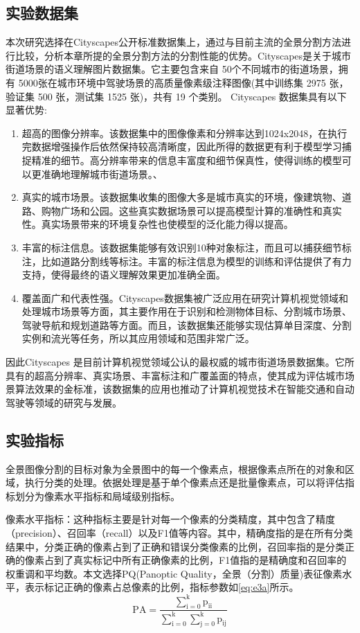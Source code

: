 \subsection{实验数据集}
本次研究选择在Cityscapes公开标准数据集上，通过与目前主流的全景分割方法进行比较，分析本章所提的全景分割方法的分割性能的优势。Cityscapes是关于城市街道场景的语义理解图片数据集。它主要包含来自 50个不同城市的街道场景，拥有 5000张在城市环境中驾驶场景的高质量像素级注释图像(其中训练集 2975 张，验证集 500 张，测试集 1525 张)，共有 19 个类别。
Cityscapes 数据集具有以下显著优势:
\begin{enumerate}
    \item 超高的图像分辨率。该数据集中的图像像素和分辨率达到1024x2048，在执行完数据增强操作后依然保持较高清晰度，因此所得的数据更有利于模型学习捕捉精准的细节。高分辨率带来的信息丰富度和细节保真性，使得训练的模型可以更准确地理解城市街道场景。、
    \item 真实的城市场景。该数据集收集的图像大多是城市真实的环境，像建筑物、道路、购物广场和公园。这些真实数据场景可以提高模型计算的准确性和真实性。真实场景带来的环境复杂性也使模型的泛化能力得以提高。
    \item 丰富的标注信息。该数据集能够有效识别10种对象标注，而且可以捕获细节标注，比如道路分割线等标注。丰富的标注信息为模型的训练和评估提供了有力支持，使得最终的语义理解效果更加准确全面。
    \item 覆盖面广和代表性强。Cityscapes数据集被广泛应用在研究计算机视觉领域和处理城市场景等方面，其主要作用在于识别和检测物体目标、分割城市场景、驾驶导航和规划道路等方面。而且，该数据集还能够实现估算单目深度、分割实例和流光等任务，所以其应用领域和范围非常广泛。
\end{enumerate}
因此Cityscapes 是目前计算机视觉领域公认的最权威的城市街道场景数据集。它所具有的超高分辨率、真实场景、丰富标注和广覆盖面的特点，使其成为评估城市场景算法效果的金标准，该数据集的应用也推动了计算机视觉技术在智能交通和自动驾驶等领域的研究与发展。



\subsection{实验指标}

全景图像分割的目标对象为全景图中的每一个像素点，根据像素点所在的对象和区域，执行分类的处理。依据处理是基于单个像素点还是批量像素点，可以将评估指标划分为像素水平指标和局域级别指标。

像素水平指标：这种指标主要是针对每一个像素的分类精度，其中包含了精度（precision）、召回率（recall）以及F1值等内容。其中，精确度指的是在所有分类结果中，分类正确的像素占到了正确和错误分类像素的比例，召回率指的是分类正确的像素占到了真实标记中所有正确像素的比例，F1值指的是精确度和召回率的权重调和平均数。本文选择PQ(Panoptic Quality，全景（分割）质量)表征像素水平，表示标记正确的像素占总像素的比例，指标参数如\cref*{eq:e3a}所示。
\begin{equation}
    \mathrm{PA}=\frac{\sum_{\mathrm{i}=0}^{\mathrm{k}} \mathrm{p}_{\mathrm{ii}}}{\sum_{\mathrm{i}=0}^{\mathrm{k}} \sum_{\mathrm{j}=0}^{\mathrm{k}} \mathrm{p}_{\mathrm{ij}}}
    \label{eq:e3a}
\end{equation}

